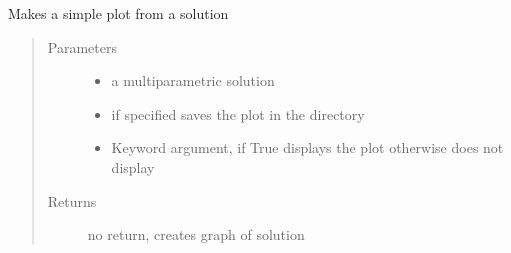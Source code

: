 \documentclass[letterpaper,10pt,english]{sphinxmanual}
\begin{document}
\begin{fulllineitems}
\label{\detokenize{mpo:mpo.plot.parametric_plot}}
\sphinxAtStartPar
Makes a simple plot from a solution
\begin{quote}\begin{description}
\item[{Parameters}] \leavevmode\begin{itemize}
\item {} 
\sphinxAtStartPar
{} \textendash{} a multiparametric solution

\item {} 
\sphinxAtStartPar
{} \textendash{} if specified saves the plot in the directory

\item {} 
\sphinxAtStartPar
{} \textendash{} Keyword argument, if True displays the plot otherwise does not display

\end{itemize}

\item[{Returns}] \leavevmode
\sphinxAtStartPar
no return, creates graph of solution

\end{description}\end{quote}

\end{fulllineitems}

\end{document}
